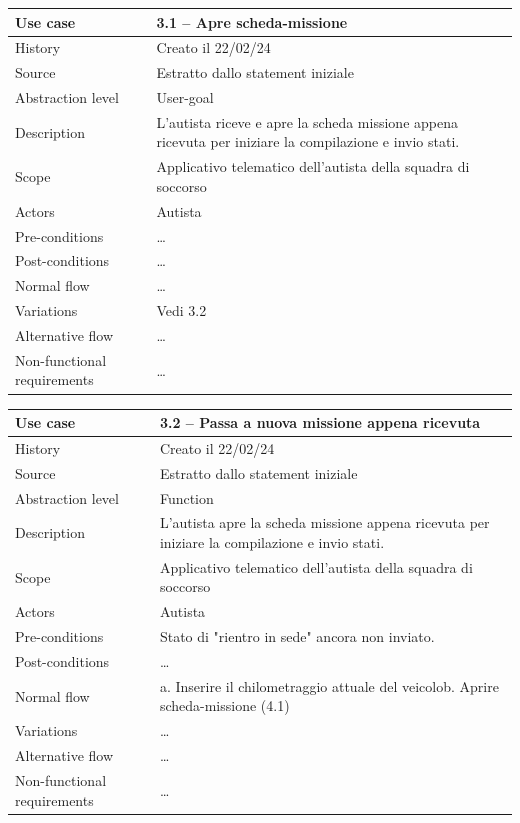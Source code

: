\documentclass{article}
\begin{document}
    \begin{table}
        \begin{tabularx}{\textwidth}{l|X}
            Use case & \textbf{3.1 – Apre scheda-missione}\\
            \hline
            History & Creato il 22/02/24\\
            Source & Estratto dallo statement iniziale\\
            Abstraction level & User-goal\\
            Description & L'autista riceve e apre la scheda missione appena ricevuta per iniziare la compilazione e invio stati.\\
            Scope & Applicativo telematico dell'autista della squadra di soccorso\\
            Actors & Autista\\
            Pre-conditions & \dots \\
            Post-conditions & \dots \\
            Normal flow & \dots\\
            Variations & Vedi 3.2 \\
            Alternative flow & \dots \\
            Non-functional requirements & \dots
        \end{tabularx}
        \label{tab:usecase3.1}
    \end{table}

    \begin{table}
        \begin{tabularx}{\textwidth}{l|X}
            Use case & \textbf{3.2 – Passa a nuova missione appena ricevuta}\\
            \hline
            History & Creato il 22/02/24\\
            Source & Estratto dallo statement iniziale\\
            Abstraction level & Function\\
            Description & L'autista apre la scheda missione appena ricevuta per iniziare la compilazione e invio stati.\\
            Scope & Applicativo telematico dell'autista della squadra di soccorso\\
            Actors & Autista\\
            Pre-conditions & Stato di "rientro in sede" ancora non inviato. \\
            Post-conditions & \dots \\
            Normal flow & a. Inserire il chilometraggio attuale del veicolo\newline b. Aprire scheda-missione (4.1)\\
            Variations & \dots \\
            Alternative flow & \dots \\
            Non-functional requirements & \dots
        \end{tabularx}
        \label{tab:usecase3.2}
    \end{table}
\end{document}
